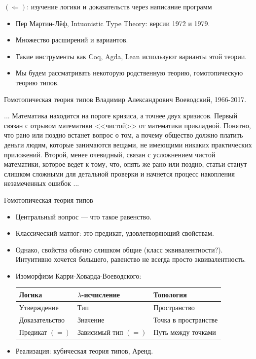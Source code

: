 \documentclass[aspectratio=169]{beamer}
\begin{document}
\begin{frame}{$(\Leftarrow)$: изучение логики и доказательств через написание программ}
\begin{itemize}
\item Пер Мартин-Лёф, Intuonistic Type Theory: версии 1972 и 1979.
\item Множество расширений и вариантов.
\item Такие инструменты как Coq, Agda, Lean используют варианты этой теории.
\item Мы будем рассматривать некоторую родственную теорию, гомотопическую теорию типов.
\end{itemize}
\end{frame}


\begin{frame}[fragile]{Гомотопическая теория типов}
Владимир Александрович Воеводский, 1966-2017. \vspace{0.5cm}

... Математика находится на пороге кризиса, а точнее двух кризисов. Первый связан с отрывом 
математики <<чистой>> от математики прикладной. Понятно, что рано или поздно встанет вопрос о 
том, а почему общество должно платить деньги людям, которые занимаются вещами, не имеющими 
никаких практических приложений. Второй, менее очевидный, связан с усложнением чистой математики, 
которое ведет к тому, что, опять же рано или поздно, статьи станут слишком сложными для детальной 
проверки и начнется процесс накопления незамеченных ошибок ...

\end{frame}

\begin{frame}[fragile]{Гомотопическая теория типов}
\begin{itemize}
\item Центральный вопрос --- что такое равенство.
\item Классический матлог: это предикат, удовлетворяющий свойствам.
\item Однако, свойства обычно слишком общие (класс эквивалентности?). Интуитивно хочется большего,
равенство не всегда просто эквивалентность.
\item Изоморфизм Карри-Ховарда-Воеводского:
\begin{tabular}{lll}
Логика & $\lambda$-исчисление & Топология\\\hline
Утверждение & Тип & Пространство \\
Доказательство & Значение & Точка в пространстве\\
Предикат $(=)$ & Зависимый тип $(=)$ & Путь между точками
\end{tabular}
\item Реализация: кубическая теория типов, Аренд.
\end{itemize}
\end{frame}
\end{document}
